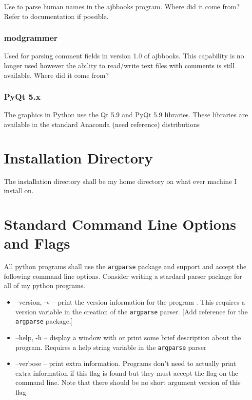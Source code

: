 Use to parse human names in the ajbbooks program.  Where did it come
from? Refer to documentation if possible.

\subsubsection{modgrammer}

Used for parsing comment fields in version 1.0 of ajbbooks. This
capability is no longer used however the ability to read/write
text files with comments is still available. Where did it come from?

\subsubsection{PyQt 5.x}

The graphics in Python use the Qt 5.9 and PyQt 5.9 libraries. These
libraries are available in the standard Anaconda (need reference)
distributions

\section{Installation Directory}

The installation directory shall be my home directory on what ever machine
I install on.

\section{Standard Command Line Options and Flags}

All python programs shall use the \texttt{argparse} package and
support and accept the following command line options. Consider
writing a stardard parser package for all of my python programs.

\begin{itemize}

  \item --version, -v -- print the version information for the program .
   This requires a version variable in the creation of the
   \texttt{argparse} parser.  [Add reference for the \texttt{argparse}
   package.]

  \item --help, -h -- display a window with or print some brief
    description about the program. Requires a help string variable in the 
    \texttt{argparse} parser 

  \item --verbose -- print extra information. Programs don't
    need to actually print extra information if this flag is found but
    they must accept the flag on the command line. Note that 
    there should be no short argument version of this flag
\end{itemize}

